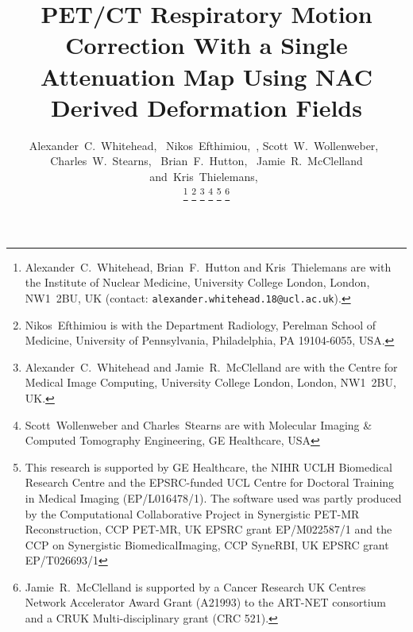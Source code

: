 \documentclass[10pt, twocolumn, twoside, letterpaper]{IEEEtran}
\begin{document}
\title{PET/CT Respiratory Motion Correction With a Single Attenuation Map Using NAC Derived Deformation Fields }

\pagestyle{plain}

\author{Alexander~C.~Whitehead,~
        Nikos~Efthimiou,~,
        Scott~W.~Wollenweber,~
        Charles~W.~Stearns,~
        Brian~F.~Hutton,~
        Jamie~R.~McClelland
        and~Kris~Thielemans,~%

    \thanks{Alexander~C.~Whitehead, Brian~F.~Hutton and Kris~Thielemans are with the Institute of Nuclear Medicine, University College London, London, NW1~2BU, UK (contact: \texttt{alexander.whitehead.18@ucl.ac.uk}).}%
    \thanks{Nikos~Efthimiou is with the Department Radiology, Perelman School of Medicine, University of Pennsylvania, Philadelphia, PA 19104-6055, USA.}%
    \thanks{Alexander~C.~Whitehead and Jamie~R.~McClelland are with the Centre for Medical Image Computing, University College London, London, NW1~2BU, UK.}%
    \thanks{Scott~Wollenweber and Charles~Stearns are with Molecular Imaging \& Computed Tomography Engineering, GE Healthcare, USA}%
    \thanks{This research is supported by GE Healthcare, the NIHR UCLH Biomedical Research Centre and the EPSRC-funded UCL Centre for Doctoral Training in Medical Imaging (EP/L016478/1). The software used was partly produced by the Computational Collaborative Project in Synergistic PET-MR Reconstruction, CCP PET-MR, UK EPSRC grant EP/M022587/1 and
    the CCP on Synergistic BiomedicalImaging, CCP SyneRBI, UK EPSRC grant EP/T026693/1}%
    \thanks{Jamie~R.~McClelland is supported by a Cancer Research UK Centres Network Accelerator Award Grant (A21993) to the ART-NET consortium and a CRUK Multi-disciplinary grant (CRC 521).}%
}

\maketitle
\IEEEpeerreviewmaketitle
\end{document}
